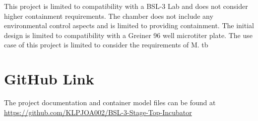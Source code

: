 \documentclass[class=report,11pt,crop=false]{standalone}
\begin{document}
This project is limited to compatibility with a BSL-3 Lab and does not consider higher containment requirements. The chamber does not include any environmental control aspects and is limited to providing containment. The initial design is limited to compatibility with a Greiner 96 well microtiter plate. The use case of this project is limited to consider the requirements of M. tb


\section{GitHub Link}
 The project documentation and container model files can be found at \url{https://github.com/KLPJOA002/BSL-3-Stage-Top-Incubator}
\ifstandalone

\fi
\end{document}
